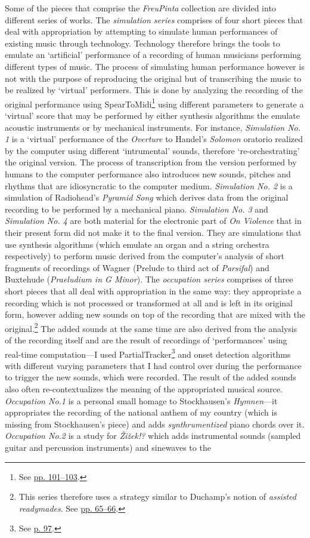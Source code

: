 Some of the pieces that comprise the \emph{FreuPinta} collection are divided into different series of works. The \emph{simulation series} comprises of four short pieces that deal with appropriation by attempting to simulate human performances of existing music through technology. Technology therefore brings the tools to emulate an `artificial' performance of a recording of human musicians performing different types of music. The process of simulating human performance however is not with the purpose of reproducing the original but of transcribing the music to be realized by `virtual' performers. This is done by analyzing the recording of the original performance using SpearToMidi\footnote{See \hyperlink{spearmidi}{pp. 101--103}.} using different parameters to generate a `virtual' score that may be performed by either synthesis algorithms the emulate acoustic instruments or by mechanical instruments. For instance, \emph{Simulation No. 1} is a `virtual' performance of the \emph{Overture} to Handel's \emph{Solomon} oratorio realized by the computer using different `intrumental' sounds, therefore `re-orchestrating' the original version. The process of transcription from the version performed by humans to the computer performance also introduces new sounds, pitches and rhythms that are idiosyncratic to the computer medium. \emph{Simulation No. 2} is a simulation of Radiohead's \emph{Pyramid Song} which derives data from the original recording to be performed by a mechanical piano. \emph{Simulation No. 3} and \emph{Simulation No. 4} are both material for the electronic part of \emph{On Violence} that in their present form did not make it to the final version. They are simulations that use synthesis algorithms (which emulate an organ and a string orchestra respectively) to perform music derived from the computer's analysis of short fragments of recordings of Wagner (Prelude to third act of \emph{Parsifal}) and Buxtehude (\emph{Praeludium in G Minor}). The \emph{occupation series} comprises of three short pieces that all deal with appropriation in the same way: they appropriate a recording which is not processed or transformed at all and is left in its original form, however adding new sounds on top of the recording that are mixed with the original.\footnote{This series therefore uses a strategy similar to Duchamp's notion of \emph{assisted readymades}. See \hyperlink{lhooq}{pp. 65--66}.} The added sounds at the same time are also derived from the analysis of the recording itself and are the result of recordings of `performances' using real-time computation---I used PartialTracker\footnote{See \hyperlink{partrack}{p. 97}.} and onset detection algorithms with different varying parameters that I had control over during the performance to trigger the new sounds, which were recorded. The result of the added sounds also often re-contextualizes the meaning of the appropriated musical source. \emph{Occupation No.1} is a personal small homage to Stockhausen's \emph{Hymnen}---it appropriates the recording of the national anthem of my country (which is missing from Stockhausen's piece) and adds \emph{synthrumentized} piano chords over it. \emph{Occupation No.2} is a study for \emph{\v{Z}i\v{z}ek!?} which adds instrumental sounds (sampled guitar and percussion instruments) and sinewaves to the 